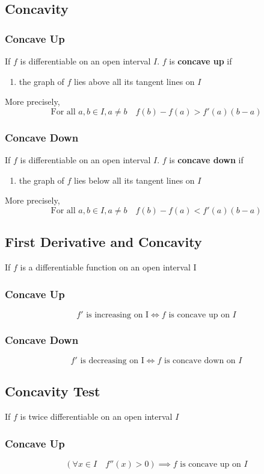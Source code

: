 \documentclass[../ma2002_notes.tex]{subfiles}
\begin{document}
\subsection{Concavity}
\subsubsection{Concave Up}
If \(f\) is differentiable on an open interval \(I\). \(f\) is \textbf{concave up} if
\begin{enumerate}
	\item the graph of \(f\) lies above all its tangent lines on \(I\)
\end{enumerate}
More precisely,
\[\text{For all }a,b\in I,a\ne b\quad f(b)-f(a)>f'(a)(b-a)\]

\subsubsection{Concave Down}
If \(f\) is differentiable on an open interval \(I\). \(f\) is \textbf{concave down} if
\begin{enumerate}
	\item the graph of \(f\) lies below all its tangent lines on \(I\)
\end{enumerate}
More precisely,
\[\text{For all }a,b\in I,a\ne b\quad f(b)-f(a)<f'(a)(b-a)\]

\subsection{First Derivative and Concavity}
If \(f\) is a differentiable function on an open interval I

\subsubsection{Concave Up}
\[f'\text{ is increasing on I}\iff f\text{ is concave up on }I\]

\subsubsection{Concave Down}
\[f'\text{ is decreasing on I}\iff f\text{ is concave down on }I\]

\subsection{Concavity Test}
If \(f\) is twice differentiable on an open interval \(I\)

\subsubsection{Concave Up}
\[(\forall x\in I\quad f''(x)>0)\implies f\text{ is concave up on }I\]
\end{document}
